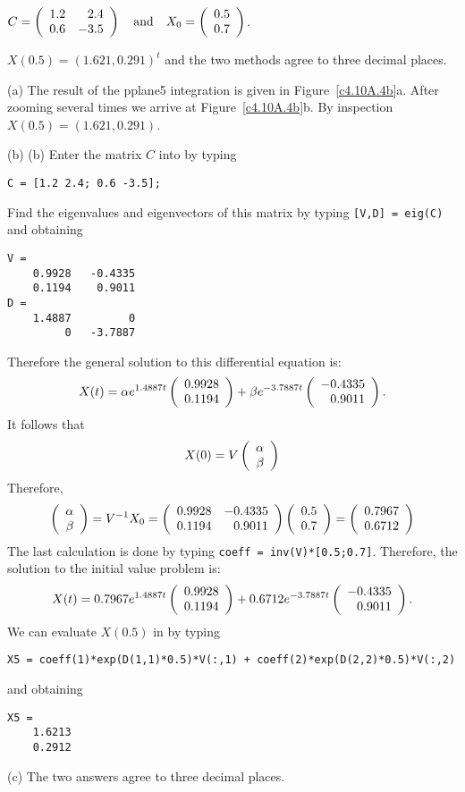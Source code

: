 \documentclass{ximera}
\begin{document}
\begin{computerExercise}  \label{c4.10A.4b}  
$C = \left(\begin{array}{rr} 1.2 & 2.4\\ 0.6 &-3.5\end{array}\right) \quad\mbox{and}\quad X_0=\left(\begin{array}{r} 0.5 \\ 0.7\end{array}\right)$.

\begin{solution}
\ans $X(0.5) = (1.621,0.291)^t$ and the two methods agree to three 
decimal places.

\soln (a) The result of the {\sf pplane5} integration is given in 
Figure~\ref{c4.10A.4b}a. After zooming several times we arrive at
Figure~\ref{c4.10A.4b}b.  By inspection $X(0.5)=(1.621,0.291)$.

(b) (b)  Enter the matrix $C$ into \Matlab by typing
\begin{verbatim}
C = [1.2 2.4; 0.6 -3.5];
\end{verbatim}
Find the eigenvalues and eigenvectors of this matrix by typing {\tt [V,D] = eig(C)}
and obtaining
\begin{verbatim}
V =
    0.9928   -0.4335
    0.1194    0.9011
D =
    1.4887         0
         0   -3.7887
\end{verbatim}
Therefore the general solution to this differential equation is:
\[
X(t) = \alpha e^{1.4887 t}\left(\begin{array}{r} 0.9928 \\ 0.1194\end{array}\right) +
\beta e^{-3.7887 t}\left(\begin{array}{r} -0.4335 \\ 0.9011\end{array}\right).
\]
It follows that 
\[
X(0) = V \left(\begin{array}{r} \alpha \\ \beta\end{array}\right)
\]
Therefore,
\[
\left(\begin{array}{r} \alpha \\ \beta\end{array}\right) = V^{-1} X_0 = 
\left(\begin{array}{rr} 0.9928 & -0.4335\\ 0.1194 &0.9011\end{array}\right)\left(\begin{array}{r} 0.5 \\ 0.7\end{array}\right) = \left(\begin{array}{r} 0.7967 \\ 0.6712\end{array}\right)
\]
The last calculation is done by typing {\tt coeff = inv(V)*[0.5;0.7]}. 
Therefore, the solution to the initial value problem is:
\[
X(t) = 0.7967e^{1.4887 t}\left(\begin{array}{r} 0.9928 \\ 0.1194\end{array}\right) +
0.6712e^{-3.7887 t}\left(\begin{array}{r} -0.4335 \\ 0.9011\end{array}\right).
\]
We can evaluate $X(0.5)$ in \Matlab by typing
\begin{verbatim}
X5 = coeff(1)*exp(D(1,1)*0.5)*V(:,1) + coeff(2)*exp(D(2,2)*0.5)*V(:,2)
\end{verbatim}
and obtaining
\begin{verbatim}
X5 =
    1.6213
    0.2912
\end{verbatim}

(c)  The two answers agree to three decimal places.


\begin{figure}[htb]
                       \centerline{%
                       }
\end{figure}



\end{solution}
\end{computerExercise}
\end{document}
